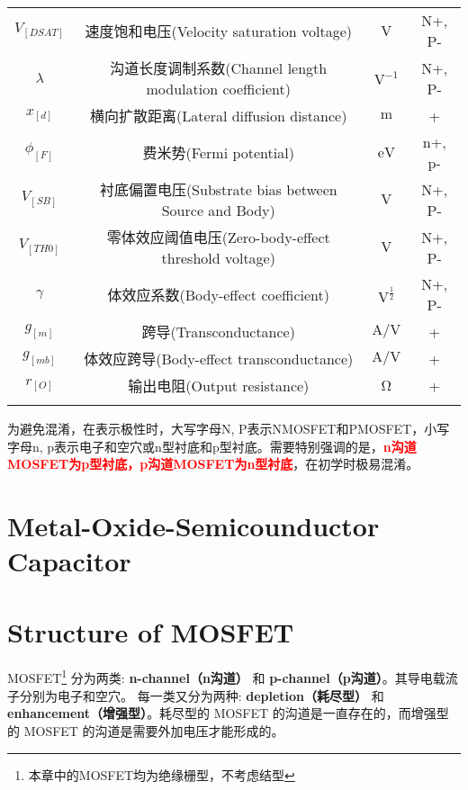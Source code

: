 \begin{table}[!htb]
\begin{NiceTabular}{cccc}
        $V_[DSAT]$ & 速度饱和电压(Velocity saturation voltage) & $\unit{\volt}$ & N+, P- \\
        $\lambda$ & 沟道长度调制系数(Channel length modulation coefficient) & $\unit{\volt \tothe{-1}}$ & N+, P- \\
        $x_[d]$ & 横向扩散距离(Lateral diffusion distance) & $\unit{\meter}$ & + \\
        $\phi_[F]$ & 费米势(Fermi potential) & $\unit{\eV}$ & n+, p- \\
        $V_[SB]$ & 衬底偏置电压(Substrate bias between Source and Body) & $\unit{\volt}$ & N+, P- \\
        $V_[TH0]$ & 零体效应阈值电压(Zero-body-effect threshold voltage) & $\unit{\volt}$ & N+, P- \\
        $\gamma$ & 体效应系数(Body-effect coefficient) & $\unit{\volt\tothe{\frac{1}{2}}}$ & N+, P-\\
        $g_[m]$ & 跨导(Transconductance) & $\unit{\ampere \per \volt}$ & + \\
        $g_[mb]$ & 体效应跨导(Body-effect transconductance) & $\unit{\ampere \per \volt}$ & + \\
        $r_[O]$ & 输出电阻(Output resistance) & $\unit{\ohm}$ & + \\
        \Xhline{1pt}
    \end{NiceTabular}
    \begin{tablenotes}
        \item 为避免混淆，在表示极性时，大写字母N, P表示NMOSFET和PMOSFET，小写字母n, p表示电子和空穴或n型衬底和p型衬底。需要特别强调的是，\textcolor{red}{\textbf{n沟道MOSFET为p型衬底，p沟道MOSFET为n型衬底}}，在初学时极易混淆。
    \end{tablenotes}
\end{table}

\section[MOS]{Metal-Oxide-Semicounductor Capacitor}

\section{Structure of MOSFET}

MOSFET\footnote{本章中的MOSFET均为绝缘栅型，不考虑结型} 分为两类: \textbf{n-channel（n沟道）} 和 \textbf{p-channel（p沟道）}。其导电载流子分别为电子和空穴。
每一类又分为两种: \textbf{depletion（耗尽型）} 和 \textbf{enhancement（增强型）}。耗尽型的 MOSFET 的沟道是一直存在的，而增强型的 MOSFET 的沟道是需要外加电压才能形成的。

